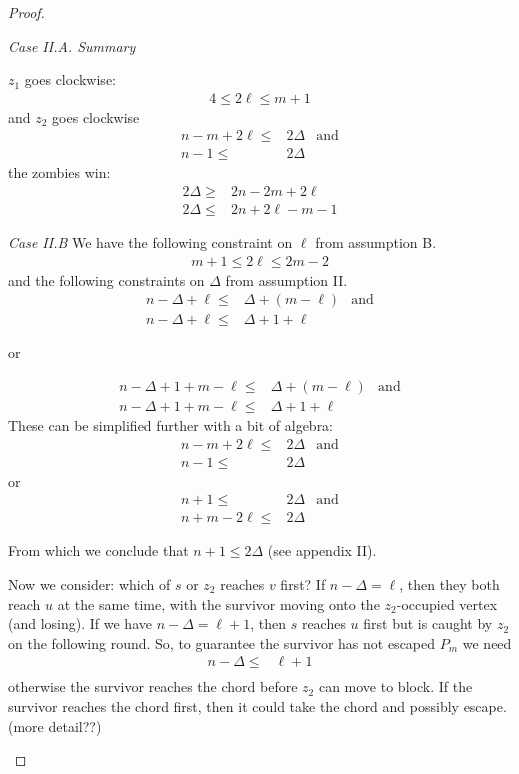\documentclass[letterpaper, 10pt]{article}
\begin{document}
\begin{proof}
\begin{proofpart}
  \textit{Case II.A. Summary}

  $z_1$ goes clockwise:
  \begin{align*}
   4 \leq 2 \ell \leq m + 1
  \end{align*}
  and $z_2$ goes clockwise
  \begin{align*}
   n -m + 2\ell \leq & 2 \Delta & \text{and} \\
   n-1 \leq          & 2 \Delta
  \end{align*}
  the zombies win:
  \begin{align*}
   2 \Delta \geq & 2n - 2m + 2\ell    \\
   2 \Delta \leq & 2n + 2\ell - m - 1
  \end{align*}

  \textit{Case II.B}  We have the following constraint on $\ell$ from
  assumption B.
  \begin{align*}
   m + 1 \leq 2 \ell \leq 2m - 2
  \end{align*}
  and the following constraints on $\Delta$ from assumption II.
  \begin{align*}
   n - \Delta + \ell \leq & \Delta + (m - \ell) & \text{and} \\
   n - \Delta + \ell \leq & \Delta + 1 + \ell
  \end{align*}
  \begin{center}or\end{center}
  \begin{align*}
   n - \Delta + 1 + m - \ell \leq & \Delta + (m - \ell) & \text{and} \\
   n - \Delta + 1 + m - \ell \leq & \Delta + 1 + \ell
  \end{align*}
  These can be simplified further with a bit of algebra:
  \begin{align*}
   n-m+2\ell \leq & 2 \Delta & \text{and} \\
   n-1 \leq       & 2\Delta
  \end{align*}
  or
  \begin{align*}
   n+1 \leq        & 2 \Delta & \text{and} \\
   n+m-2\ell  \leq & 2 \Delta
  \end{align*}

  From which we conclude that $n+1 \leq 2 \Delta$ (see appendix II).

  Now we consider: which of $s$ or $z_2$ reaches $v$ first?
  If $n - \Delta = \ell$, then they both reach $u$ at the same time,
  with the survivor moving onto the $z_2$-occupied vertex (and losing).
  If we have $n - \Delta = \ell + 1$, then $s$ reaches $u$ first
  but is caught by $z_2$ on the following round.
  So, to guarantee the survivor has not escaped $P_m$ we need
  \begin{align*}
   n - \Delta \leq & \ell + 1 \\
  \end{align*}
  otherwise the survivor reaches the chord before $z_2$ can move
  to block. If the survivor reaches the chord first, then it could
  take the chord and possibly escape. (more detail??)


\end{proofpart}
\end{proof}
\end{document}

